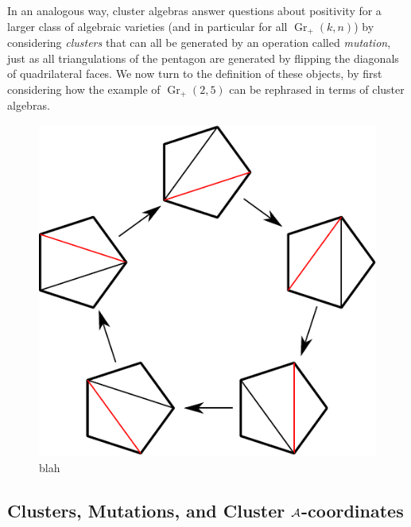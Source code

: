 \documentclass[11pt]{article}
\DeclareMathOperator{\Gr}{Gr}
\begin{document}
In an analogous way, cluster algebras answer questions about positivity for a larger class of algebraic varieties (and in particular for all $\Gr_+(k,n)$) by considering {\it clusters} that can all be generated by an operation called {\it mutation}, just as all triangulations of the pentagon are generated by flipping the diagonals of quadrilateral faces. We now turn to the definition of these objects, by first considering how the example of $\Gr_+(2,5)$ can be rephrased in terms of cluster algebras.

\begin{figure}[t]   \centering
  \includegraphics[scale=0.6]{pentagon-triangulations} 
  \caption{blah}
\label{fig:pent_triangulations}
\end{figure}


\subsection{Clusters, Mutations, and Cluster ${\cal A}$-coordinates}
\end{document}
